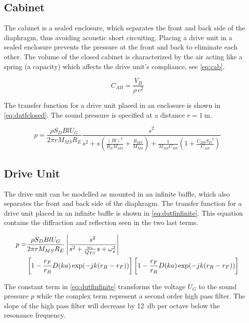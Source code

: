 \subsection{Cabinet}
The cabinet is a sealed enclosure, which separates the front and back side of the diaphragm, thus avoiding acoustic short circuiting. 
Placing a drive unit in a sealed enclosure prevents the pressure at the front and back to eliminate each other. \cite[p.~44]{Elektroakustik}  
The volume of the closed cabinet is characterized by the air acting like a spring (a capacity) which affects the drive unit's compliance, see \cref{eq:cab}. 

\begin{equation}
C_{AB} = \frac{V_B}{\rho \,c^2}
\label{eq:cab}
\end{equation} 

The transfer function for a drive unit placed in an enclosure is shown in \cref{eq:dutfclosed}.
The sound pressure is specified at a distance $r=\SI{1}{\meter}$. 

\begin{equation}
p = \frac{\rho S_D B l U_G}{2\pi r M_{MS} R_E}\frac{s^2}{s^2 +s \left(\frac{(Bl)^2}{R_EM_{MS}}+\frac{R_{MS}}{M_{MS}}\right)+\frac{1}{M_{MS}C_{MS}}\left(1+\frac{C_{MS}{S_D}^2}{C_{AB}}\right)}
\label{eq:dutfclosed}
\end{equation}

\subsection{Drive Unit}
\label{seq:driveunit}
The drive unit can be modelled as mounted in an infinite baffle, which also separates the front and back side of the diaphragm.
The transfer function for a drive unit placed in an infinite baffle is shown in \cref{eq:dutfinfinite}. This equation contains the diffraction and reflection seen in the two last terms.


\begin{align}
	p =& \frac{\rho S_D B l U_G}{2\pi r M_{MS} R_E}\left|\frac{s^2}{s^2 + \frac{\omega_s}{Q_{TS}}s+\omega_s^2}\right| \label{eq:dutfinfinite} \\
	& \left[1-\frac{r_F}{r_B}D(ka)\exp(-jk(r_B-r_F))\right] \left[1-\frac{r_F}{r_R}D(ka)\exp(-jk(r_R-r_F))\right]\notag
\end{align}

The constant term in \cref{eq:dutfinfinite} transforms the voltage $U_G$ to the sound pressure $p$ while the complex term represent a second order high pass filter.
The slope of the high pass filter will decrease by \SI{12}{\decibel} per octave below the resonance frequency.\\

